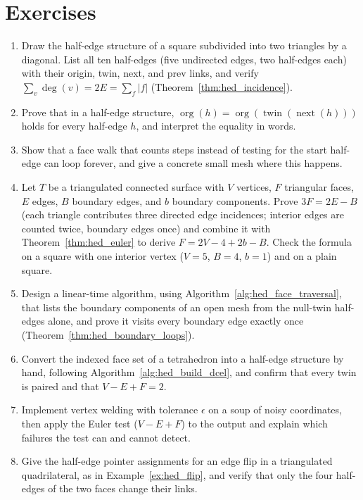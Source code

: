 
\section{Exercises}
\label{sec:halfedge_exercises}

\begin{enumerate}
  \item Draw the half-edge structure of a square subdivided into two
    triangles by a diagonal. List all ten half-edges (five undirected
    edges, two half-edges each) with their origin, twin, next, and prev
    links, and verify $\sum_v \deg(v) = 2E = \sum_f |f|$
    (Theorem~\ref{thm:hed_incidence}).
  \item Prove that in a half-edge structure, $\operatorname{org}(h) =
    \operatorname{org}(\operatorname{twin}(\operatorname{next}(h)))$
    holds for every half-edge $h$, and interpret the equality in words.
  \item Show that a face walk that counts steps instead of testing for the
    start half-edge can loop forever, and give a concrete small mesh where
    this happens.
  \item Let $T$ be a triangulated connected surface with $V$ vertices,
    $F$ triangular faces, $E$ edges, $B$ boundary edges, and $b$ boundary
    components. Prove $3F = 2E - B$ (each triangle contributes three
    directed edge incidences; interior edges are counted twice, boundary
    edges once) and combine it with Theorem~\ref{thm:hed_euler} to derive
    $F = 2V - 4 + 2b - B$. Check the formula on a square with one interior
    vertex ($V = 5$, $B = 4$, $b = 1$) and on a plain square.
  \item Design a linear-time algorithm, using
    Algorithm~\ref{alg:hed_face_traversal}, that lists the boundary
    components of an open mesh from the null-twin half-edges alone, and
    prove it visits every boundary edge exactly once
    (Theorem~\ref{thm:hed_boundary_loops}).
  \item Convert the indexed face set of a tetrahedron into a half-edge
    structure by hand, following Algorithm~\ref{alg:hed_build_dcel}, and
    confirm that every twin is paired and that $V - E + F = 2$.
  \item Implement vertex welding with tolerance $\epsilon$ on a soup of
    noisy coordinates, then apply the Euler test
    ($V - E + F$) to the output and explain which failures the test can
    and cannot detect.
  \item Give the half-edge pointer assignments for an edge flip in a
    triangulated quadrilateral, as in Example~\ref{ex:hed_flip}, and verify
    that only the four half-edges of the two faces change their links.
\end{enumerate}
